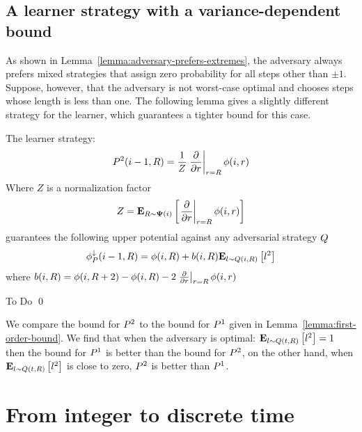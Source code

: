 \documentclass{article}[12pt]
\begin{document}
  \subsection{A learner strategy with a variance-dependent bound}

  As shown in Lemma~\ref{lemma:adversary-prefers-extremes}, the
  adversary always prefers mixed strategies that assign zero
  probability for all steps other than $\pm 1$. Suppose, however, that
  the adversary is not worst-case optimal and chooses steps whose
  length is less than one. The following lemma gives a slightly
  different strategy for the learner, which guarantees a tighter bound
  for this case.

  \begin{lemma} \label{lemma:second-order-bound}
      The learner strategy:
      \begin{equation} \label{eqn:learner-strat-2}
      P^2(i-1,R) =  \frac{1}{Z}
      \left. \frac{\partial}{\partial r} \right|_{r=R} \phi(i,r)
      \end{equation}
      Where $Z$ is a normalization factor
      $$Z = {\bf E}_{R \sim {\bf \Psi}(i)}\left[ \left. \frac{\partial}{\partial r} \right|_{r=R} \phi(i,r) \right]$$
      guarantees the following upper potential against any adversarial
      strategy $Q$
      \begin{equation} \label{eqn:value-iteration-upper}
        \phi_{P}^{\downarrow}(i-1, R) = \phi(i,R) + b(i,R) {\bf E}_{l \sim Q(i,R)}\left[ l^2 \right]
      \end{equation}
      where $b(i,R) = \phi(i,R+2) -\phi(i,R) - 2 \left. \frac{\partial}{\partial r} \right|_{r=R} \phi(i,r)$
   \end{lemma}

   \proof
   To Do
   \qed
   
We compare the bound for $P^2$ to the bound for $P^1$
given in Lemma~\ref{lemma:first-order-bound}. We find that when the 
adversary is optimal: ${\bf E}_{l \sim Q(t,R)}\left[ l^2 \right]=1$ then the
bound for $P^1$ is better than the bound for $P^2$, on the
other hand, when ${\bf E}_{l \sim Q(t,R)}\left[ l^2 \right]$ is close to zero,
$P^2$ is better than $P^1$.  

\section{From integer to discrete time}
\label{sec:discrete}
\end{document}

